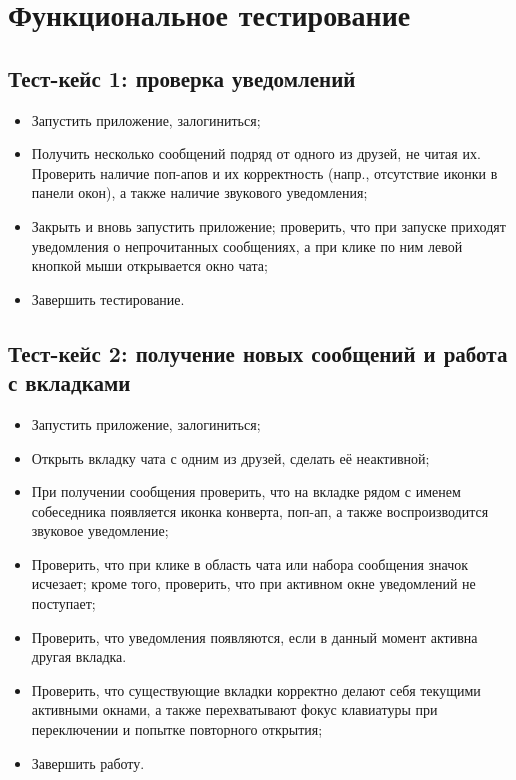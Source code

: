 \documentclass[12pt]{article}
\begin{document}
\newpage
\section{Функциональное тестирование}
\subsection{Тест-кейс 1: проверка уведомлений}
\begin{itemize}
\setlength{\itemsep}{-1mm}
\item Запустить приложение, залогиниться;
\item Получить несколько сообщений подряд от одного из друзей, не читая их. Проверить наличие поп-апов и их корректность (напр., отсутствие иконки в панели окон), а также наличие звукового уведомления;
\item Закрыть и вновь запустить приложение; проверить, что при запуске приходят уведомления о непрочитанных сообщениях, а при клике по ним левой кнопкой мыши открывается окно чата;
\item Завершить тестирование.
\end{itemize}

\subsection{Тест-кейс 2: получение новых сообщений и работа с вкладками}
\begin{itemize}
\setlength{\itemsep}{-1mm}
\item Запустить приложение, залогиниться;
\item Открыть вкладку чата с одним из друзей, сделать её неактивной;
\item При получении сообщения проверить, что на вкладке рядом с именем собеседника появляется иконка конверта, поп-ап, а также воспроизводится звуковое уведомление;
\item Проверить, что при клике в область чата или набора сообщения значок исчезает; кроме того, проверить, что при активном окне уведомлений не поступает;
\item Проверить, что уведомления появляются, если в данный момент активна другая вкладка.
\item Проверить, что существующие вкладки корректно делают себя текущими активными окнами, а также перехватывают фокус клавиатуры при переключении и попытке повторного открытия;
\item Завершить работу.
\end{itemize}
\end{document}
